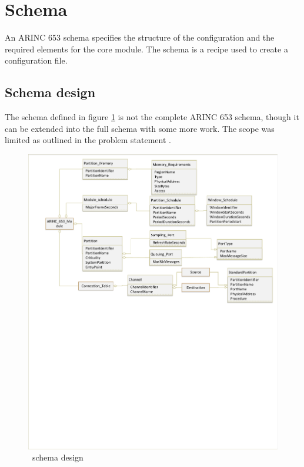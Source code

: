 \section{Schema}
\label{sec:design_schema}
An ARINC 653 schema specifies the structure
of the configuration and the required elements
for the core module.
The schema is a recipe used to create a configuration file.


\subsection{Schema design}
The schema defined in figure \ref{fig:open653schema} is not the complete
ARINC 653 schema, though it can be extended
into the full schema with some more work.
The scope was limited as outlined in the
problem statement .

\begin{figure}[H]	\includegraphics[clip=true,trim=0cm 20cm 0cm 0cm,width=\linewidth,keepaspectratio]{figures/open653schema.pdf}
	\caption{\OSname\ schema design}
	\label{fig:open653schema}
\end{figure}

